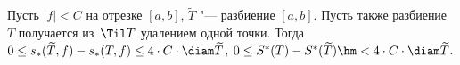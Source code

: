 
 	Пусть $|f|<C$ на отрезке $[a,b]$, $\widetilde T$ "--- разбиение $[a,b]$.
 	Пусть также разбиение $T$ получается из~$\Til T$ удалением
 	одной точки. Тогда $0\leq s_*(\widetilde T,f)-s_*(T,f)\leq 4\cdot C\cdot\diam \widetilde T$,\pau
    $0\leq S^*(T)-S^*(\widetilde T)\hm<4\cdot C\cdot\diam \widetilde T$.	
 